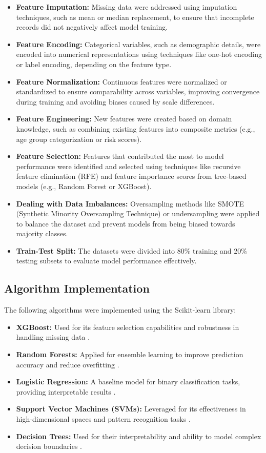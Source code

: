 \documentclass[conference]{IEEEtran}
\begin{document}
\begin{itemize}
    \item \textbf{Feature Imputation:} Missing data were addressed using imputation techniques, such as mean or median replacement, to ensure that incomplete records did not negatively affect model training.
    \item \textbf{Feature Encoding:} Categorical variables, such as demographic details, were encoded into numerical representations using techniques like one-hot encoding or label encoding, depending on the feature type.
    \item \textbf{Feature Normalization:} Continuous features were normalized or standardized to ensure comparability across variables, improving convergence during training and avoiding biases caused by scale differences.
    \item \textbf{Feature Engineering:} New features were created based on domain knowledge, such as combining existing features into composite metrics (e.g., age group categorization or risk scores).
    \item \textbf{Feature Selection:} Features that contributed the most to model performance were identified and selected using techniques like recursive feature elimination (RFE) and feature importance scores from tree-based models (e.g., Random Forest or XGBoost).
    \item \textbf{Dealing with Data Imbalances:} Oversampling methods like SMOTE (Synthetic Minority Oversampling Technique) or undersampling were applied to balance the dataset and prevent models from being biased towards majority classes.
    \item \textbf{Train-Test Split:} The datasets were divided into 80\% training and 20\% testing subsets to evaluate model performance effectively.
\end{itemize}

\subsection{Algorithm Implementation}
The following algorithms were implemented using the Scikit-learn library:
\begin{itemize}
    \item \textbf{XGBoost:} Used for its feature selection capabilities and robustness in handling missing data \cite{b1}.
    \item \textbf{Random Forests:} Applied for ensemble learning to improve prediction accuracy and reduce overfitting \cite{b2}.
    \item \textbf{Logistic Regression:} A baseline model for binary classification tasks, providing interpretable results \cite{b7}.
    \item \textbf{Support Vector Machines (SVMs):} Leveraged for its effectiveness in high-dimensional spaces and pattern recognition tasks \cite{b3}.
    \item \textbf{Decision Trees:} Used for their interpretability and ability to model complex decision boundaries \cite{b7}.
\end{itemize}
\end{document}
